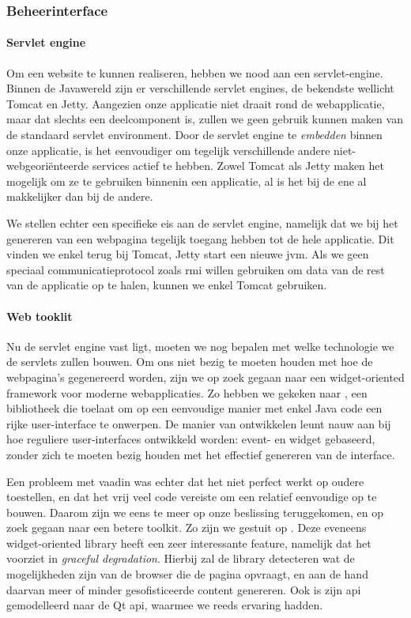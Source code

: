 \subsubsection{Beheerinterface}

\paragraph{Servlet engine} Om een website te kunnen realiseren, hebben we nood aan een servlet-engine. Binnen de Javawereld zijn er verschillende servlet engines, de bekendste wellicht Tomcat en Jetty. Aangezien onze applicatie niet draait rond de webapplicatie, maar dat slechts een deelcomponent is, zullen we geen gebruik kunnen maken van de standaard servlet environment. Door de servlet engine te \emph{embedden} binnen onze applicatie, is het eenvoudiger om tegelijk verschillende andere niet-webgeoriënteerde services actief te hebben. Zowel Tomcat als Jetty maken het mogelijk om ze te gebruiken binnenin een applicatie, al is het bij de ene al makkelijker dan bij de andere.

We stellen echter een specifieke eis aan de servlet engine, namelijk dat we bij het genereren van een webpagina tegelijk toegang hebben tot de hele applicatie. Dit vinden we enkel terug bij Tomcat, Jetty start een nieuwe \ac{jvm}. Als we geen speciaal communicatieprotocol zoals \ac{rmi} willen gebruiken om data van de rest van de applicatie op te halen, kunnen we enkel Tomcat gebruiken.

\paragraph{Web tooklit} Nu de servlet engine vast ligt, moeten we nog bepalen met welke technologie we de servlets zullen bouwen. Om ons niet bezig te moeten houden met hoe de webpagina's gegenereerd worden, zijn we op zoek gegaan naar een widget-oriented framework voor moderne webapplicaties. Zo hebben we gekeken naar , een bibliotheek die toelaat om op een eenvoudige manier met enkel Java code een rijke user-interface te onwerpen. De manier van ontwikkelen leunt nauw aan bij hoe reguliere user-interfaces ontwikkeld worden: event- en widget gebaseerd, zonder zich te moeten bezig houden met het effectief genereren van de interface.

Een probleem met vaadin was echter dat het niet perfect werkt op oudere toestellen, en dat het vrij veel code vereiste om een relatief eenvoudige  op te bouwen. Daarom zijn we eens te meer op onze beslissing teruggekomen, en op zoek gegaan naar een betere toolkit. Zo zijn we gestuit op . Deze eveneens widget-oriented library heeft een zeer interessante feature, namelijk dat het voorziet in \emph{graceful degradation}. Hierbij zal de library detecteren wat de mogelijkheden zijn van de browser die de pagina opvraagt, en aan de hand daarvan meer of minder gesofisticeerde content genereren. Ook is zijn \ac{api} gemodelleerd naar de Qt \ac{api}, waarmee we reeds ervaring hadden. 

